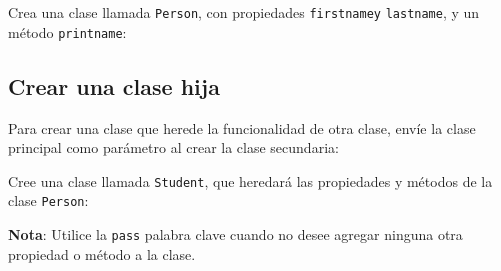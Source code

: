 \begin{code}
Crea una clase llamada \texttt{Person}, con propiedades \texttt{firstnamey} \texttt{lastname}, y un método \texttt{printname}:

\begin{Shaded}
\begin{Highlighting}[]
   \NormalTok{(}
    \OperatorTok{=}
    \OperatorTok{=}

  \NormalTok{):}
    \NormalTok{(}


\OperatorTok{=}\NormalTok{, }\NormalTok{)}
\end{Highlighting}
\end{Shaded}
\end{code}

\subsection{Crear una clase hija}

Para crear una clase que herede la funcionalidad de otra clase, envíe la
clase principal como parámetro al crear la clase secundaria: \\

\begin{code}
Cree una clase llamada \texttt{Student}, que heredará las propiedades y métodos de la clase \texttt{Person}:

\begin{Shaded}
\begin{Highlighting}[]

\end{Highlighting}
\end{Shaded}
\end{code}

\textbf{Nota}: Utilice la \texttt{pass} palabra clave cuando no desee agregar ninguna otra propiedad o método a la clase.

